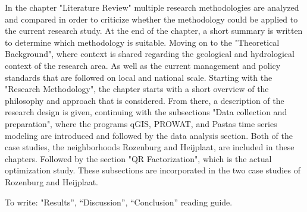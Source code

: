 In the chapter "Literature Review" multiple research methodologies are analyzed and compared in order to criticize whether the methodology could be applied to the current research study. At the end of the chapter, a short summary is written to determine which methodology is suitable. Moving on to the "Theoretical Background", where context is shared regarding the geological and hydrological context of the research area. As well as the current management and policy standards that are followed on local and national scale. Starting with the "Research Methodology", the chapter starts with a short overview of the philosophy and approach that is considered. From there, a description of the research design is given, continuing with the subsections "Data collection and preparation", where the programs qGIS, PROWAT, and Pastas time series modeling are introduced and followed by the data analysis section. Both of the case studies, the neighborhoods Rozenburg and Heijplaat, are included in these chapters. Followed by the section "QR Factorization", which is the actual optimization study. These subsections are incorporated in the two case studies of Rozenburg and Heijplaat. 

To write: "Results”, “Discussion”, “Conclusion” reading guide. 





